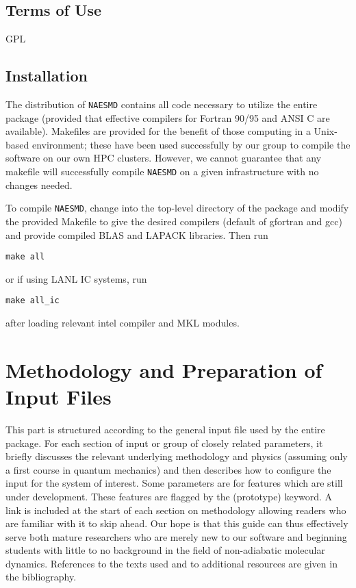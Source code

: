\documentclass[12pt,letter,footinclude=true,headinclude=true,hyphens]{book} %
\begin{document}
    \chapter{Terms of Use}
    
    GPL
    
    \chapter{Installation}
    
    The distribution of \texttt{NAESMD} contains all code necessary to utilize the entire package (provided that effective compilers for Fortran 90/95 and ANSI C are available). Makefiles are provided for the benefit of those computing in a Unix-based environment; these have been used successfully by our group to compile the software on our own HPC clusters. However, we cannot guarantee that any makefile will successfully compile  \texttt{NAESMD} on a given infrastructure with no changes needed.
    
    To compile \texttt{NAESMD}, change into the top-level directory of the package and modify the provided Makefile to give the desired compilers (default of gfortran and gcc) and provide compiled BLAS and LAPACK libraries. Then run
    
    \texttt{make all}

or if using LANL IC systems, run

    \texttt{make all\_ic}

after loading relevant intel compiler and MKL modules.    
    
    \part{Methodology and Preparation of Input Files}
    
    This part is structured according to the general input file used by the entire package. For each section of input or group of closely related parameters, it briefly discusses the relevant underlying methodology and physics (assuming only a first course in quantum mechanics) and then describes how to configure the input for the system of interest. Some parameters are for features which are still under development. These features are flagged by the (prototype) keyword. A link is included at the start of each section on methodology allowing readers who are familiar with it to skip ahead. Our hope is that this guide can thus effectively serve both mature researchers who are merely new to our software and beginning students with little to no background in the field of non-adiabatic molecular dynamics. References to the texts used and to additional resources are given in the bibliography.
    
\end{document}
